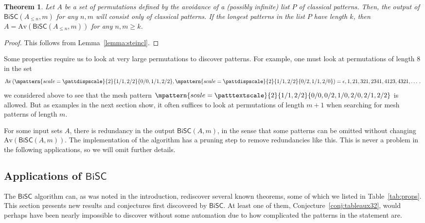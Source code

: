 \documentclass[a4paper]{article}
\newcommand{\bisc}{\mathsf{BiSC}}
\newcommand{\Av}{\mathrm{Av}}
\newtheorem{theorem}{Theorem}[section]
\begin{document}
\begin{theorem} \label{thm:classical}
  Let $A$ be a set of permutations defined by the avoidance of a (possibly infinite)
  list $P$ of classical patterns. Then, the output of $\bisc(A_{\leq n},m)$ for any $n,m$ will consist only
  of classical patterns.
  If the longest patterns in the list $P$ have length $k$, then
  $A = \Av(\bisc(A_{\leq n},m))$ for any $n,m \geq k$.
\end{theorem}
\begin{proof}
  This follows from Lemma~\ref{lemma:steincl}.
\end{proof}

Some properties require us to look at very large permutations to discover patterns. For
example, one must look at permutations of length $8$ in the set
\begin{equation*}
  \Av \left( \mpattern{scale=\pattdispscale}{ 2 }{ 1/1, 2/2 }{0/0,1/1,2/2},\mpattern{scale=\pattdispscale}{ 2 }{ 1/1, 2/2 }{0/2,1/1,2/0} \right) = \epsilon, 1,21,321,2341,4123,4321, \dotsc.
\end{equation*}
we considered above
to see that the mesh pattern $\mpattern{scale=\patttextscale}{ 2 }{ 1/1, 2/2 }{0/0,0/2,1/0,2/0,2/1,2/2}$ is allowed.
But as examples in the next section show, it often suffices to look at permutations of length $m+1$ when
searching for mesh patterns of length $m$.

For some input sets $A$, there is redundancy in the output $\bisc(A,m)$, in the sense that
some patterns can be omitted without changing $\Av(\bisc(A,m))$. The implementation of the
algorithm has a pruning step to remove redundancies like this.
This is never a problem in the following applications, so we will omit further details.

\subsection{Applications of $\bisc$}
\label{subsec:appl}

The $\bisc$ algorithm can, as was noted in the introduction, rediscover several known
theorems, some of which we listed in Table~\ref{tab:props}. This section presents new results and conjectures
first discovered by $\bisc$. At least one of them, Conjecture~\ref{conj:tableaux32}, would perhaps have
been nearly impossible to discover without some automation due to how complicated
the patterns in the statement are.
\end{document}
